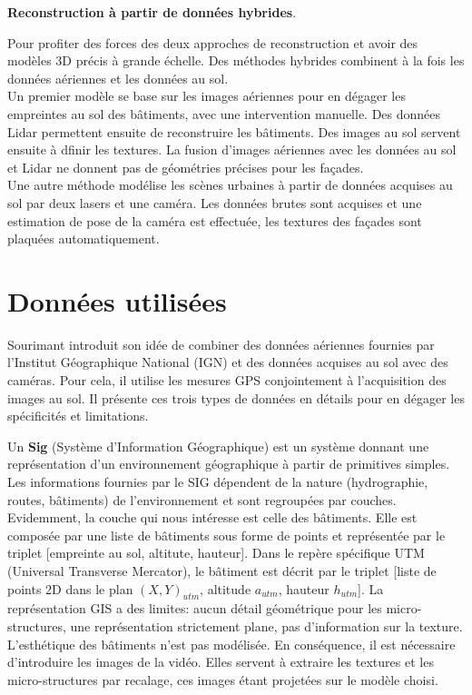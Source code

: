 \documentclass[11pt]{article}
\begin{document}
\textbf{Reconstruction à partir de données hybrides}.

Pour profiter des forces des deux approches de reconstruction et avoir des modèles 3D précis à grande échelle. Des méthodes hybrides combinent à la fois les données aériennes et les données au sol.\\
Un premier modèle se base sur les images aériennes pour en dégager les empreintes au sol des bâtiments, avec une intervention manuelle. Des données Lidar permettent ensuite de reconstruire les bâtiments. Des images au sol servent ensuite à dfinir les textures. La fusion d'images aériennes avec les données au sol et Lidar ne donnent pas de géométries précises pour les façades.\\
Une autre méthode modélise les scènes urbaines à partir de données acquises au sol par deux lasers et une caméra. Les données brutes sont acquises et une estimation de pose de la caméra est effectuée, les textures des façades sont plaquées automatiquement. 

\section{Données utilisées}

Sourimant introduit son idée de combiner des données aériennes fournies par l'Institut Géographique National (IGN) et des données acquises au sol avec des caméras. Pour cela, il utilise les mesures GPS conjointement à l'acquisition des images au sol. Il présente ces trois types de données en détails pour en dégager les spécificités et limitations.

Un \textbf{Sig} (Système d'Information Géographique) est un système donnant une représentation d'un environnement géographique à partir de primitives simples. Les informations fournies par le SIG dépendent de la nature (hydrographie, routes, bâtiments) de l'environnement et sont regroupées par couches. Evidemment, la couche qui nous intéresse est celle des bâtiments. Elle est composée par une liste de bâtiments sous forme de points et représentée par le triplet [empreinte au sol, altitute, hauteur]. Dans le repère spécifique UTM (Universal Transverse Mercator), le bâtiment est décrit par le triplet [liste de  points 2D dans le plan $(X,Y)_{utm}$, altitude $a_{utm}$, hauteur $h_{utm}$]. La représentation GIS a des limites: aucun détail géométrique pour les micro-structures, une représentation strictement plane, pas d'information sur la texture. L'esthétique des bâtiments n'est pas modélisée. En conséquence, il est nécessaire d'introduire les images de la vidéo. Elles servent à extraire les textures et les micro-structures par recalage, ces images étant projetées sur le modèle choisi.
\end{document}
